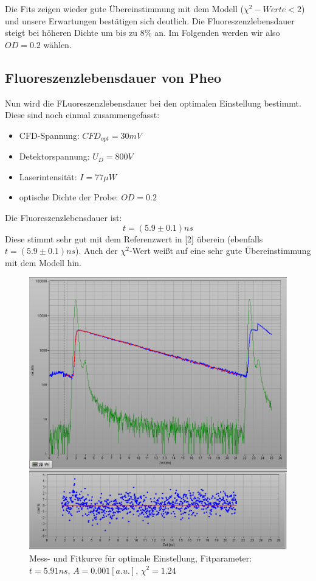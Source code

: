 \documentclass{article}
\begin{document}
Die Fits zeigen wieder gute Übereinstimmung mit dem Modell ($\chi^2-Werte <2$) und unsere Erwartungen bestätigen sich deutlich.
Die Fluoreszenzlebensdauer steigt bei höheren Dichte um bis zu 8\% an. Im Folgenden werden wir also $OD = 0.2$ wählen.




\subsection{Fluoreszenzlebensdauer von Pheo}
Nun wird die FLuoreszenzlebensdauer bei den optimalen Einstellung bestimmt. Diese sind noch einmal zusammengefasst:

\begin{itemize}
  \item CFD-Spannung: $CFD_{opt}=30mV$
  \item Detektorspannung: $U_D=800V$
  \item Laserintensität: $I=77\mu W$
  \item optische Dichte der Probe: $OD=0.2$
\end{itemize}

Die Fluoreszenzlebensdauer ist: $$t=(5.9 \pm 0.1)ns$$
Diese stimmt sehr gut mit dem Referenzwert in [2] überein (ebenfalls $t=(5.9 \pm 0.1)ns$). Auch der $\chi^2$-Wert weißt auf
eine sehr gute Übereinstimmung mit dem Modell hin.

\begin{figure}[h]
  \centering
  \includegraphics[width=\textwidth]{Bilder/messung_opt.jpg}
  \caption{Mess- und Fitkurve für optimale Einstellung, Fitparameter: $t=5.91ns$, $A=0.001[a.u.]$, $\chi^2=1.24$}
\end{figure}
\end{document}
